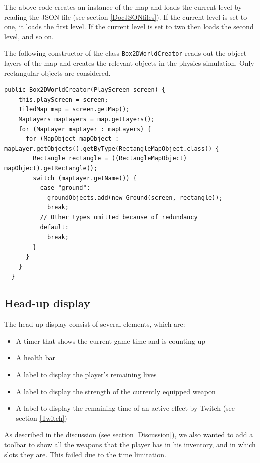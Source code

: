 \documentclass[12p]{article}
\begin{document}
The above code creates an instance of the map and loads the current level by reading the JSON file (see section \ref{DocJSONfiles}). If the current level is set to one, it loads the first level. If the current level is set to two then loads the second level, and so on.

The following constructor of the class \texttt{Box2DWorldCreator} reads out the object layers of the map and creates the relevant objects in the physics simulation. Only rectangular objects are considered.

\newpage

\begin{verbatim}
public Box2DWorldCreator(PlayScreen screen) {
    this.playScreen = screen;
    TiledMap map = screen.getMap();
    MapLayers mapLayers = map.getLayers();
    for (MapLayer mapLayer : mapLayers) {
      for (MapObject mapObject : mapLayer.getObjects().getByType(RectangleMapObject.class)) {
        Rectangle rectangle = ((RectangleMapObject) mapObject).getRectangle();
        switch (mapLayer.getName()) {
          case "ground":
            groundObjects.add(new Ground(screen, rectangle));
            break;
          // Other types omitted because of redundancy
          default:
            break;
        }
      }
    }
  }
\end{verbatim}


\newpage
\subsection{Head-up display} \label{DocHUD}

The head-up display consist of several elements, which are:

\begin{itemize}
  \item A timer that shows the current game time and is counting up
  \item A health bar
  \item A label to display the player's remaining lives
  \item A label to display the strength of the currently equipped weapon
  \item A label to display the remaining time of an active effect by Twitch (see section \ref{Twitch})
\end{itemize}

As described in the discussion (see section \ref{Discussion}), we also wanted to add a toolbar to show all the weapons that the player has in his inventory, and in which slots they are. This failed due to the time limitation.
\end{document}

